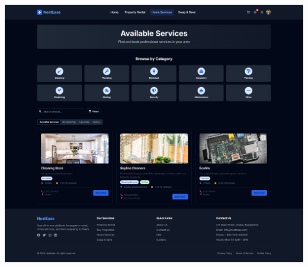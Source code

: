\documentclass[conference]{IEEEtran}
\begin{document}
\begin{center}
\begin{minipage}[t]{0.45\textwidth}
\end{minipage} \hfill
\begin{minipage}[t]{0.45\textwidth}
\includegraphics[width=\linewidth]{Project Screenshot/Home Services.png}
\end{minipage}


\end{center}
\end{document}
